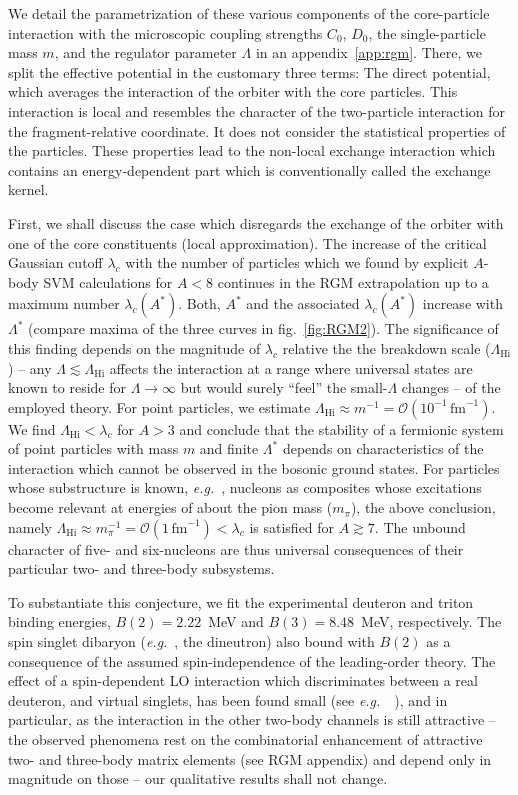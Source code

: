 \documentclass[preprint,12pt]{elsarticle}
\newcommand{\largescale}{\ensuremath{\Lambda_\text{Hi}}}
\newcommand{\lc}{\ensuremath{\lambda_c}}
\newcommand{\fm}{\ensuremath{\,\text{fm}^{-1}}}
\newcommand{\eg}{\textit{e.g.}~}
\newcommand{\figref}[1]{fig.~\ref{#1}}
\begin{document}
We detail the parametrization of these various components of the core-particle 
interaction with the
microscopic coupling strengths $C_0$, $D_0$, the single-particle mass $m$, and the
 regulator parameter $\Lambda$
in an appendix~\ref{app:rgm}.
There, we split the effective potential in the customary three terms:
The direct potential, which averages the interaction of the orbiter with the core 
particles. This interaction is
local and resembles the character of the two-particle interaction for the 
fragment-relative coordinate. It does not
consider the statistical properties of the particles.
These properties lead to the non-local exchange interaction which contains an
 energy-dependent part which
is conventionally called the exchange kernel.

First, we shall discuss the case which disregards the exchange of the orbiter with 
one of the core constituents (local approximation).
The increase of the critical Gaussian cutoff $\lc$ with the number of
particles which we found by explicit $A$-body SVM calculations for $A<8$
continues in the RGM extrapolation up to a maximum number $\lc(A^*)$.
Both, $A^*$ and the associated $\lc(A^*)$ increase with $\Lambda^*$
(compare maxima of the three curves in \figref{fig:RGM2}).
The significance of this finding depends on the magnitude of $\lc$
relative the the breakdown scale ($\largescale$) -- any 
$\Lambda\lesssim\largescale$ affects the interaction at a range where
universal states are known
to reside for $\Lambda\to\infty$ but would surely ``feel'' the small-$\Lambda$
changes -- of the employed theory. For point particles, we estimate
$\largescale\approx m^{-1}=\mathcal{O}(10^{-1}\fm)$.
We find $\largescale<\lc$ for $A>3$ and conclude that the
stability of a fermionic system of point particles with mass $m$ and
finite $\Lambda^*$ depends on characteristics of the interaction which cannot
be observed in the bosonic ground states.
For particles whose substructure is known, \eg, nucleons as composites whose
excitations become relevant at energies of about the pion mass ($m_\pi$),
the above conclusion, namely 
\mbox{$\largescale\approx m_\pi^{-1}=\mathcal{O}(1\fm)<\lc$}
is satisfied for $A\gtrsim7$. The unbound character of five- and six-nucleons
are thus universal consequences of their particular two- and three-body subsystems.

To substantiate this conjecture, we fit the experimental deuteron and triton
binding energies, $B(2)=2.22$~MeV and $B(3)=8.48$~MeV, respectively. 
The spin singlet dibaryon (\eg, the dineutron) also bound with $B(2)$ as a consequence
of the assumed spin-independence of the leading-order theory.
The effect of a spin-dependent LO interaction which discriminates between a real
deuteron, and virtual singlets, has been found small (see \eg~\cite{}), and in
particular, as the interaction in the other two-body channels is still
attractive -- the observed phenomena rest on the combinatorial enhancement of
attractive two- and three-body matrix elements (see RGM appendix) and
depend only in magnitude on those -- our qualitative results shall not change.
\end{document}
